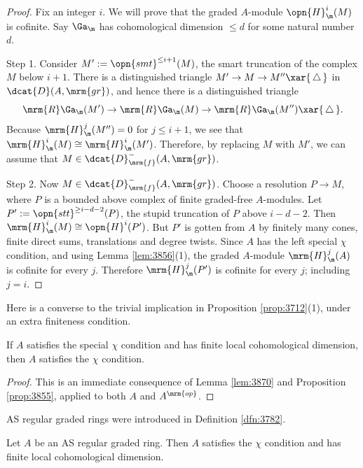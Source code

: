 \begin{proof}
Fix an integer $i$. We will prove that the graded $A$-module 
$\opn{H}^i_{\m}(M)$ is cofinite. Say $\Ga_{\m}$ has cohomological dimension 
$\leq d$ for some natural number $d$. 

\medskip \noindent
Step 1. Consider 
$M' := \opn{smt}^{\leq i + 1}(M)$,
the smart truncation of the complex $M$ below $i + 1$. 
There is a distinguished triangle 
$M' \to M \to M'' \xar{{\,} \triangle {\,}}$
in $\dcat{D}(A, \mrm{gr})$, 
and hence there is a distinguished triangle 
\[ \mrm{R} \Ga_{\m}(M') \to \mrm{R} \Ga_{\m}(M) \to 
\mrm{R} \Ga_{\m}(M'') \xar{ \, \triangle \, } . \]
Because $\mrm{H}^j_{\m}(M'') = 0$ for $j \leq i + 1$, we see that 
$\mrm{H}^i_{\m}(M) \cong \mrm{H}^i_{\m}(M')$. 
Therefore, by replacing $M$ with $M'$, we can assume that 
$M \in \dcat{D}^-_{\mrm{f}}(A, \mrm{gr})$.

\medskip \noindent
Step 2. Now $M \in \dcat{D}^-_{\mrm{f}}(A, \mrm{gr})$.
Choose a resolution $P \to M$, where $P$ is a bounded above complex of finite 
graded-free $A$-modules. Let 
$P' := \opn{stt}^{\geq i - d -2}(P)$, the stupid truncation of $P$ above 
$i - d -2$. Then 
$\mrm{H}^i_{\m}(M) \cong \opn{H}^i(P')$.
But $P'$ is gotten from $A$ by finitely many cones, finite direct sums, 
translations and degree twists. Since $A$ has the left special $\chi$ 
condition, and using Lemma \ref{lem:3856}(1), the graded $A$-module 
$\mrm{H}^j_{\m}(A)$ is cofinite for every $j$. Therefore  
$\mrm{H}^j_{\m}(P')$ is cofinite for every $j$; including $j = i$. 
\end{proof}

Here is a converse to the trivial implication in Proposition 
\ref{prop:3712}(1), under an extra finiteness condition. 

\begin{prop} \label{prop:3870}
If $A$ satisfies the special $\chi$ condition and has finite local 
cohomological 
dimension, then $A$ satisfies the $\chi$ condition. 
\end{prop}

\begin{proof}
This is an immediate consequence of Lemma \ref{lem:3870} and Proposition 
\ref{prop:3855}, applied to both $A$ and $A^{\mrm{op}}$. 
\end{proof}

AS regular graded rings were introduced in Definition \ref{dfn:3782}. 

\begin{cor} \label{cor:3870}
Let $A$ be an AS regular graded ring. 
Then $A$ satisfies the $\chi$ condition and has finite local 
cohomological dimension.
\end{cor}

